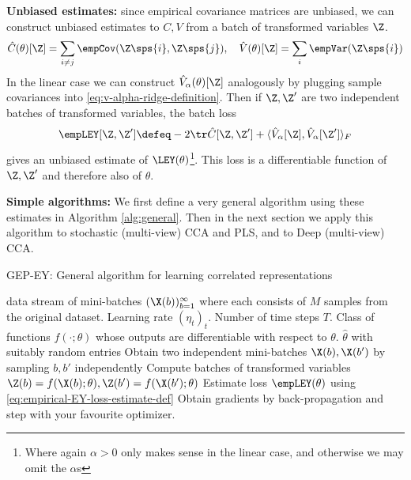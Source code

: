 \textbf{Unbiased estimates:}
since empirical covariance matrices are unbiased, we can construct unbiased estimates to $C, V$ from a batch of transformed variables $\Z$.
\begin{align}\label{eq:def-C-V-matrices-empirical}
    \hat{C}(\theta)[\Z] = \sum_{i \neq j} \empCov(\Z\sps{i}, \Z\sps{j}), \quad
    \hat{V}(\theta)[\Z] = \sum_{i} \empVar(\Z\sps{i})
\end{align}
In the linear case we can construct $\hat{V}_\alpha(\theta)[\Z]$ analogously by plugging sample covariances into \cref{eq:v-alpha-ridge-definition}.
Then if $\Z, \Z'$ are two independent batches of transformed variables, the batch loss
\begin{align}\label{eq:empirical-EY-loss-estimate-def}
    \empLEY[\Z, \Z'] \defeq - 2 \tr \hat{C}[\Z, \Z'] + \langle \hat{V}_\alpha[\Z], \hat{V}_\alpha[\Z'] \rangle_F
\end{align}
gives an unbiased estimate of $\LEY(\theta)$\footnote{Where again $\alpha > 0$ only makes sense in the linear case, and otherwise we may omit the $\alpha$s}.
This loss is a differentiable function of $\Z, \Z'$ and therefore also of $\theta$.

\textbf{Simple algorithms:}
We first define a very general algorithm using these estimates in Algorithm \ref{alg:general}. Then in the next section we apply this algorithm to stochastic (multi-view) CCA and PLS, and to Deep (multi-view) CCA.

\begin{algorithm}
   \caption{GEP-EY: General algorithm for learning correlated representations}
   \label{alg:general}
\begin{algorithmic}
    data stream of mini-batches $(\X(b))_{b=1}^\infty$ where each consists of $M$ samples from the original dataset. Learning rate $(\eta_t)_t$. Number of time steps $T$. Class of functions $f(\cdot; \theta)$ whose outputs are differentiable with respect to $\theta$.
    $\hat{\theta}$ with suitably random entries
       \STATE Obtain two independent mini-batches \( \X(b), \X(b') \) by sampling \( b, b' \) independently
       \STATE Compute batches of transformed variables $\Z(b) = f(\X(b); \theta), \Z(b') = f(\X(b'); \theta)$
       \STATE Estimate loss $\empLEY(\theta)$ using \cref{eq:empirical-EY-loss-estimate-def}
       \STATE Obtain gradients by back-propagation and step with your favourite optimizer.
   \ENDFOR
\end{algorithmic}
\end{algorithm}

